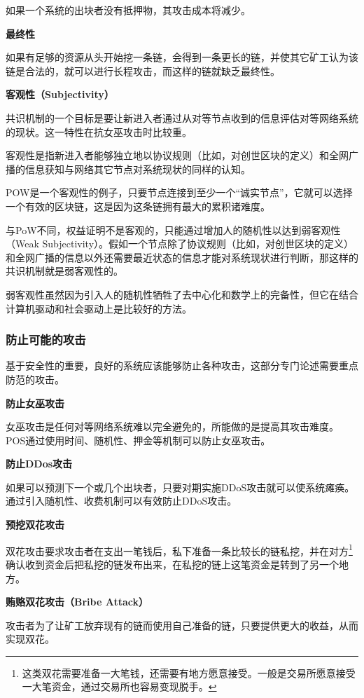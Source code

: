 \documentclass[a4paper,12pt]{article}
\begin{document}
如果一个系统的出块者没有抵押物，其攻击成本将减少。

\textbf{最终性}

如果有足够的资源从头开始挖一条链，会得到一条更长的链，并使其它矿工认为该链是合法的，就可以进行长程攻击，而这样的链就缺乏最终性。

\textbf{客观性（Subjectivity）}

共识机制的一个目标是要让新进入者通过从对等节点收到的信息评估对等网络系统的现状。这一特性在抗女巫攻击时比较重。

客观性是指新进入者能够独立地以协议规则（比如，对创世区块的定义）和全网广播的信息获知与网络其它节点对系统现状的同样的认知。

POW是一个客观性的例子，只要节点连接到至少一个“诚实节点”，它就可以选择一个有效的区块链，这是因为这条链拥有最大的累积诸难度。

与PoW不同，权益证明不是客观的，只能通过增加人的随机性以达到弱客观性（Weak Subjectivity）。假如一个节点除了协议规则（比如，对创世区块的定义）和全网广播的信息以外还需要最近状态的信息才能对系统现状进行判断，那这样的共识机制就是弱客观性的。

弱客观性虽然因为引入人的随机性牺牲了去中心化和数学上的完备性，但它在结合计算机驱动和社会驱动上是比较好的方法\citep{VB_PoS}。

\subsubsection{防止可能的攻击}

基于安全性的重要，良好的系统应该能够防止各种攻击，这部分专门论述需要重点防范的攻击。

\textbf{防止女巫攻击}

女巫攻击是任何对等网络系统难以完全避免的，所能做的是提高其攻击难度。POS通过使用时间、随机性、押金等机制可以防止女巫攻击。

\textbf{防止DDos攻击}

如果可以预测下一个或几个出块者，只要对期实施DDoS攻击就可以使系统瘫痪。通过引入随机性、收费机制可以有效防止DDoS攻击。


\textbf{预挖双花攻击}

双花攻击要求攻击者在支出一笔钱后，私下准备一条比较长的链私挖，并在对方\footnote{这类双花需要准备一大笔钱，还需要有地方愿意接受。一般是交易所愿意接受一大笔资金，通过交易所也容易变现脱手。}确认收到资金后把私挖的链发布出来，在私挖的链上这笔资金是转到了另一个地方。


\textbf{贿赂双花攻击（Bribe Attack）}

攻击者为了让矿工放弃现有的链而使用自己准备的链，只要提供更大的收益，从而实现双花。
\end{document}

